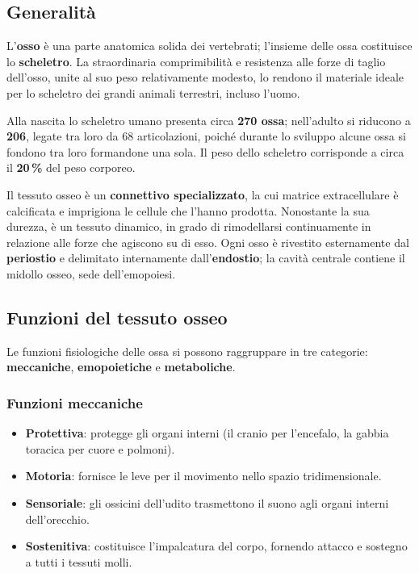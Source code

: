 \subsection{Generalità}

L'\textbf{osso} è una parte anatomica solida dei vertebrati; l'insieme delle
ossa costituisce lo \textbf{scheletro}. La straordinaria comprimibilità e
resistenza alle forze di taglio dell'osso, unite al suo peso relativamente
modesto, lo rendono il materiale ideale per lo scheletro dei grandi animali
terrestri, incluso l'uomo.

Alla nascita lo scheletro umano presenta circa \textbf{270 ossa}; nell'adulto
si riducono a \textbf{206}, legate tra loro da 68 articolazioni, poiché
durante lo sviluppo alcune ossa si fondono tra loro formandone una sola. Il
peso dello scheletro corrisponde a circa il \textbf{20\,\%} del peso
corporeo.

Il tessuto osseo è un \textbf{connettivo specializzato}, la cui matrice
extracellulare è calcificata e imprigiona le cellule che l'hanno prodotta.
Nonostante la sua durezza, è un tessuto dinamico, in grado di rimodellarsi
continuamente in relazione alle forze che agiscono su di esso. Ogni osso è
rivestito esternamente dal \textbf{periostio} e delimitato internamente
dall'\textbf{endostio}; la cavità centrale contiene il midollo osseo, sede
dell'emopoiesi.

\subsection{Funzioni del tessuto osseo}

Le funzioni fisiologiche delle ossa si possono raggruppare in tre categorie:
\textbf{meccaniche}, \textbf{emopoietiche} e \textbf{metaboliche}.

\subsubsection{Funzioni meccaniche}

\begin{itemize}
  \item \textbf{Protettiva}: protegge gli organi interni (il cranio per
    l'encefalo, la gabbia toracica per cuore e polmoni).
  \item \textbf{Motoria}: fornisce le leve per il movimento nello spazio
    tridimensionale.
  \item \textbf{Sensoriale}: gli ossicini dell'udito trasmettono il suono agli
    organi interni dell'orecchio.
  \item \textbf{Sostenitiva}: costituisce l'impalcatura del corpo, fornendo
    attacco e sostegno a tutti i tessuti molli.
\end{itemize}

